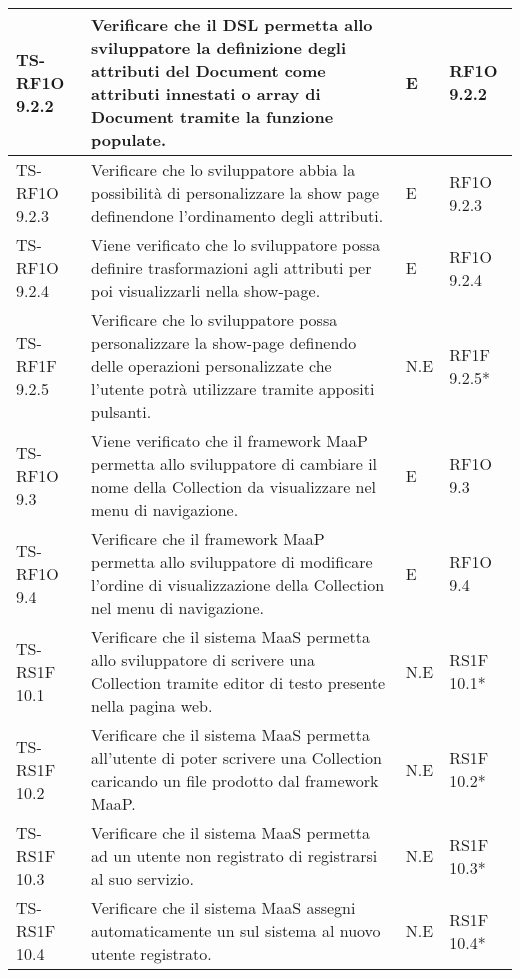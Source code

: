 \begin{center}
\begin{longtable}{| p{3cm} | p{6cm} | p{1.5cm} | p{2cm} | }
				TS-RF1O 9.2.2 & 
				Verificare che il DSL permetta allo sviluppatore la definizione degli attributi del Document come attributi innestati o array di Document tramite la funzione populate. & E & RF1O 9.2.2 \newline  \\ \hline 
				TS-RF1O 9.2.3 & 
				Verificare che lo sviluppatore abbia la possibilità di personalizzare la show page definendone l’ordinamento degli attributi. & E & RF1O 9.2.3 \newline  \\ \hline 
				TS-RF1O 9.2.4 & 
				Viene verificato che lo sviluppatore possa definire trasformazioni agli attributi per poi visualizzarli nella show-page. & E & RF1O 9.2.4 \newline  \\ \hline 
				TS-RF1F 9.2.5 & 
				Verificare che lo sviluppatore possa personalizzare la show-page definendo delle operazioni personalizzate che l’utente potrà utilizzare tramite appositi pulsanti. & N.E & RF1F 9.2.5*  \newline  \\ \hline 
				TS-RF1O 9.3 & 
				Viene verificato che il framework MaaP permetta allo sviluppatore di cambiare il nome della Collection da visualizzare nel menu di navigazione. & E & RF1O 9.3 \newline  \\ \hline 
				TS-RF1O 9.4 & 
				Verificare che il framework MaaP permetta allo sviluppatore di modificare l’ordine di visualizzazione della Collection nel menu di navigazione. & E & RF1O 9.4 \newline  \\ \hline 
				TS-RS1F 10.1 & 
				Verificare che il sistema MaaS permetta allo sviluppatore di scrivere una Collection tramite editor di testo presente nella pagina web. & N.E & RS1F 10.1*  \newline  \\ \hline 
				TS-RS1F 10.2 & 
				Verificare che il sistema MaaS permetta all'utente di poter scrivere una Collection caricando un file prodotto dal framework MaaP. & N.E & RS1F 10.2*  \newline  \\ \hline 
				TS-RS1F 10.3 & 
				Verificare che il sistema MaaS permetta ad un utente non registrato di registrarsi al suo servizio. & N.E & RS1F 10.3*  \newline  \\ \hline 
				TS-RS1F 10.4 & 
				Verificare che il sistema MaaS assegni automaticamente un \glossario{namespace} sul sistema al nuovo utente registrato. & N.E & RS1F 10.4*  \newline  \\ \hline 

\end{longtable}
\end{center}
